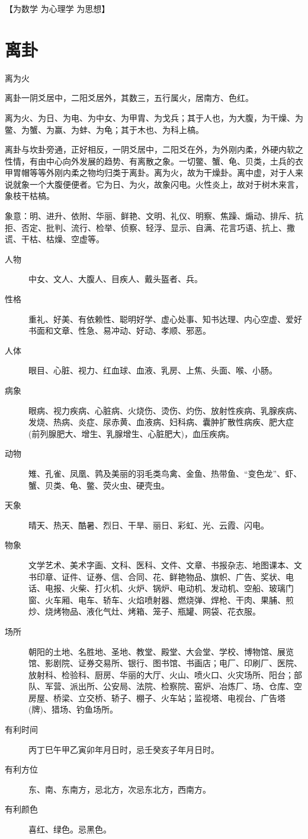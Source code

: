 \documentclass[12pt,oneside]{book}
\begin{document}
【为数学 为心理学 为思想】


\section{离卦}
离为火

离卦一阴爻居中，二阳爻居外，其数三，五行属火，居南方、色红。

离为火、为日、为电、为中女、为甲胄、为戈兵；其于人也，为大腹，为干燥、为鳖、为蟹、为赢、为蚌、为龟；其于木也、为科上槁。

离卦与坎卦旁通，正好相反，一阴爻居中，二阳爻在外，为外刚内柔，外硬内软之性情，有由中心向外发展的趋势、有离散之象。一切鳖、蟹、龟、贝类，土兵的衣甲胃帽等等外刚内柔之物均归类于离卦。离为火，故为干燥卦。离中虚，对于人来说就象一个大腹便便者。它为日、为火，故象闪电。火性炎上，故对于树木来言，象枝干枯槁。

象意：明、进升、依附、华丽、鲜艳、文明、礼仪、明察、焦躁、煽动、排斥、抗拒、否定、批判、流行、检举、侦察、轻浮、显示、自满、花言巧语、抗上、撒谎、干枯、枯燥、空虚等。

\begin{description}
\item[人物] 中女、文人、大腹人、目疾人、戴头盔者、兵。
\item[性格] 重礼、好美、有依赖性、聪明好学、虚心处事、知书达理、内心空虚、爱好书面和文章、性急、易冲动、好动、孝顺、邪恶。
\item[人体] 眼目、心脏、视力、红血球、血液、乳房、上焦、头面、喉、小肠。
\item[病象] 眼病、视力疾病、心脏病、火烧伤、烫伤、灼伤、放射性疾病、乳腺疾病、发烧、热病、炎症、尿赤黄、血液病、妇科病、囊肿扩散性病疾、肥大症(前列腺肥大、增生、乳腺增生、心脏肥大)，血压疾病。
\item[动物] 雉、孔雀、凤凰、鹑及美丽的羽毛类鸟禽、金鱼、热带鱼、“变色龙”、虾、蟹、贝类、龟、鳖、荧火虫、硬壳虫。
\item[天象] 晴天、热天、酷暑、烈日、干旱、丽日、彩虹、光、云霞、闪电。
\item[物象] 文学艺术、美术字画、文科、医科、文件、文章、书报杂志、地图课本、文书印章、证件、证券、信、合同、花、鲜艳物品、旗帜、广告、奖状、电话、电报、火柴、打火机、火炉、锅炉、电动机、发动机、空船、玻璃门窗、火车厢、电车、轿车、火焰喷射器、燃烧弹、焊枪、干肉、果脯、煎炒、烧烤物品、液化气灶、烤箱、笼子、瓶罐、网袋、花衣服。
\item[场所] 朝阳的土地、名胜地、圣地、教堂、殿堂、大会堂、学校、博物馆、展览馆、影剧院、证券交易所、银行、图书馆、书画店；电厂、印刷厂、医院、放射科、检验科、厨房、华丽的大厅、火山、喷火口、火灾场所、阳台；部队、军营、派出所、公安局、法院、检察院、窑炉、冶炼厂、场、仓库、空房屋、桥梁、立交桥、轿子、棚子、火车站；监视塔、电视台、广告塔(牌)、猎场、钓鱼场所。
\item[有利时间] 丙丁巳午甲乙寅卯年月日时，忌壬癸亥子年月日时。
\item[有利方位] 东、南、东南方，忌北方，次忌东北方，西南方。
\item[有利颜色] 喜红、绿色。忌黑色。
\end{description}
\end{document}
